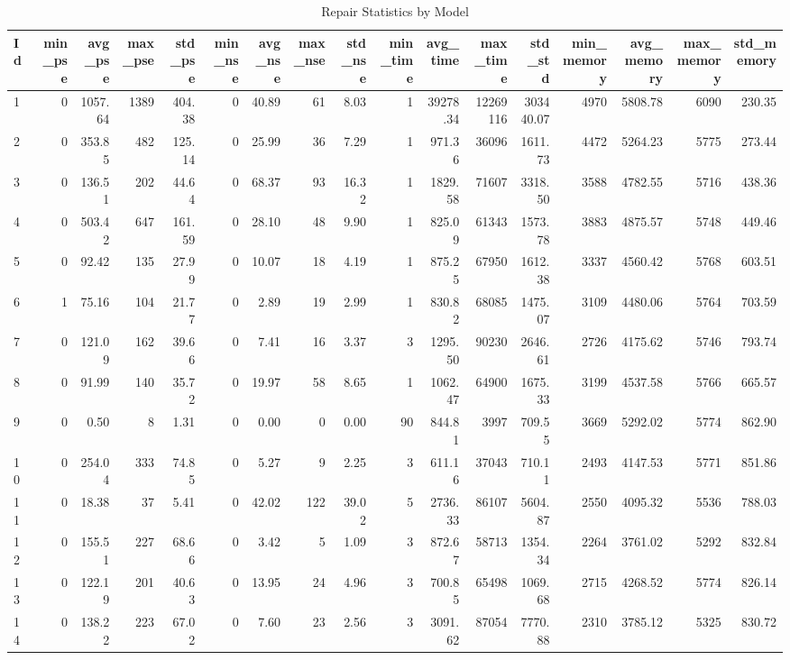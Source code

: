 \begin{table}
\caption{Repair Statistics by Model}
\label{tab:repair_stats}
\begin{tabular}{lrrrrrrrrrrrrrrrr}
\toprule
Id & min_pse & avg_pse & max_pse & std_pse & min_nse & avg_nse & max_nse & std_nse & min_time & avg_time & max_time & std_std & min_memory & avg_memory & max_memory & std_memory \\
\midrule
1 & 0 & 1057.64 & 1389 & 404.38 & 0 & 40.89 & 61 & 8.03 & 1 & 39278.34 & 12269116 & 303440.07 & 4970 & 5808.78 & 6090 & 230.35 \\
2 & 0 & 353.85 & 482 & 125.14 & 0 & 25.99 & 36 & 7.29 & 1 & 971.36 & 36096 & 1611.73 & 4472 & 5264.23 & 5775 & 273.44 \\
3 & 0 & 136.51 & 202 & 44.64 & 0 & 68.37 & 93 & 16.32 & 1 & 1829.58 & 71607 & 3318.50 & 3588 & 4782.55 & 5716 & 438.36 \\
4 & 0 & 503.42 & 647 & 161.59 & 0 & 28.10 & 48 & 9.90 & 1 & 825.09 & 61343 & 1573.78 & 3883 & 4875.57 & 5748 & 449.46 \\
5 & 0 & 92.42 & 135 & 27.99 & 0 & 10.07 & 18 & 4.19 & 1 & 875.25 & 67950 & 1612.38 & 3337 & 4560.42 & 5768 & 603.51 \\
6 & 1 & 75.16 & 104 & 21.77 & 0 & 2.89 & 19 & 2.99 & 1 & 830.82 & 68085 & 1475.07 & 3109 & 4480.06 & 5764 & 703.59 \\
7 & 0 & 121.09 & 162 & 39.66 & 0 & 7.41 & 16 & 3.37 & 3 & 1295.50 & 90230 & 2646.61 & 2726 & 4175.62 & 5746 & 793.74 \\
8 & 0 & 91.99 & 140 & 35.72 & 0 & 19.97 & 58 & 8.65 & 1 & 1062.47 & 64900 & 1675.33 & 3199 & 4537.58 & 5766 & 665.57 \\
9 & 0 & 0.50 & 8 & 1.31 & 0 & 0.00 & 0 & 0.00 & 90 & 844.81 & 3997 & 709.55 & 3669 & 5292.02 & 5774 & 862.90 \\
10 & 0 & 254.04 & 333 & 74.85 & 0 & 5.27 & 9 & 2.25 & 3 & 611.16 & 37043 & 710.11 & 2493 & 4147.53 & 5771 & 851.86 \\
11 & 0 & 18.38 & 37 & 5.41 & 0 & 42.02 & 122 & 39.02 & 5 & 2736.33 & 86107 & 5604.87 & 2550 & 4095.32 & 5536 & 788.03 \\
12 & 0 & 155.51 & 227 & 68.66 & 0 & 3.42 & 5 & 1.09 & 3 & 872.67 & 58713 & 1354.34 & 2264 & 3761.02 & 5292 & 832.84 \\
13 & 0 & 122.19 & 201 & 40.63 & 0 & 13.95 & 24 & 4.96 & 3 & 700.85 & 65498 & 1069.68 & 2715 & 4268.52 & 5774 & 826.14 \\
14 & 0 & 138.22 & 223 & 67.02 & 0 & 7.60 & 23 & 2.56 & 3 & 3091.62 & 87054 & 7770.88 & 2310 & 3785.12 & 5325 & 830.72 \\

\end{tabular}
\end{table}
